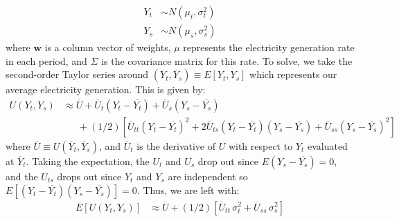 \documentclass[12pt,a4paper]{extarticle}
\begin{document}
\vspace{-2em}
\begin{align*}
Y_t &\sim  N \left( \mu_t, \sigma_t^2 \right) \\
Y_s &\sim  N \left( \mu_s, \sigma_s^2 \right)
\end{align*}
where $\textbf{w}$ is a column vector of weights, $\mu$ represents the electricity generation rate in each period, and $\Sigma$ is the covariance matrix for this rate. 
To solve, we take the second-order Taylor series around $(\overline{Y}_t, \overline{Y}_s) \equiv E \left[ Y_t, Y_s \right]$ which represents our average electricity generation. This is given by:
\begin{align*}
U(Y_t, Y_s) &\approx \overline{U} + \overline{U}_t(Y_t - \overline{Y_t}) + \overline{U}_s(Y_s - \overline{Y_s}) \\
&\phantom{\approx} \, + (1/2) \left[ \overline{U}_{tt}(Y_t - \overline{Y_t})^2 + 2 \overline{U}_{ts}(Y_t - \overline{Y_t})(Y_s - \overline{Y_s})  + \overline{U}_{ss}(Y_s - \overline{Y_s})^2 \right]
\end{align*}
where $\overline{U} \equiv U(\overline{Y}_t, \overline{Y}_s)$, and $\overline{U}_t$ is the derivative of $U$ with respect to $Y_t$ evaluated at $\overline{Y}_t$. Taking the expectation, the $U_t$ and $U_s$ drop out since $E(Y_s - \overline{Y_s}) = 0$, and the $U_{ts}$ drops out since $Y_t$ and $Y_s$ are independent so $E\left[(Y_t - \overline{Y_t})(Y_s - \overline{Y_s})\right] = 0 $. Thus, we are left with:
\begin{align*}
E \left[ U(Y_t, Y_s) \right] &\approx \overline{U} + (1/2) \left[\overline{U}_{tt}\,\sigma_t^2 + \overline{U}_{ss}\, \sigma_s^2 \right]
\end{align*}

%
\end{document}
